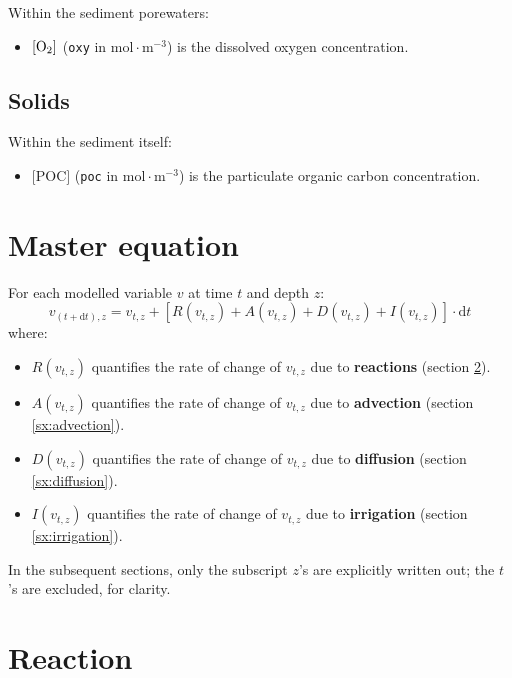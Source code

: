 \documentclass[a4paper]{article}
\newcommand{\D}[1]{\mathrm{d}#1}
\newcommand{\code}[1]{\texttt{#1}}
\newcommand{\molmmm}{\mathrm{mol}\cdot\mathrm{m}^{-3}}
\begin{document}
Within the sediment porewaters:
\begin{itemize}
  \item $[\ce{O2}]$ (\code{oxy} in $\molmmm$) is the dissolved oxygen concentration.
\end{itemize}

\subsection{Solids}

Within the sediment itself:
\begin{itemize}
  \item $[$POC$]$ (\code{poc} in $\molmmm$) is the particulate organic carbon concentration.
\end{itemize}

\section{Master equation}

For each modelled variable $v$ at time $t$ and depth $z$:
\begin{equation}
v_{(t+\D{t}), z} = v_{t,z} + [R(v_{t,z}) + A(v_{t,z}) + D(v_{t,z}) + I(v_{t,z})] \cdot \D{t}
\end{equation}
where:
\begin{itemize}
  \item $R(v_{t,z})$ quantifies the rate of change of $v_{t,z}$ due to \textbf{reactions} (section \ref{sx:reaction}).
  \item $A(v_{t,z})$ quantifies the rate of change of $v_{t,z}$ due to \textbf{advection} (section \ref{sx:advection}).
  \item $D(v_{t,z})$ quantifies the rate of change of $v_{t,z}$ due to \textbf{diffusion} (section \ref{sx:diffusion}).
  \item $I(v_{t,z})$ quantifies the rate of change of $v_{t,z}$ due to \textbf{irrigation} (section \ref{sx:irrigation}).
\end{itemize}
In the subsequent sections, only the subscript $z$'s are explicitly written out; the $t$'s are excluded, for clarity.


\section{Reaction}\label{sx:reaction}
\end{document}
